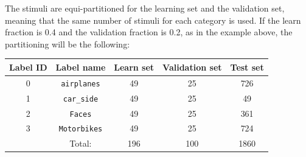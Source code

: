 \documentclass[a4paper,11pt,oneside]{article}
\begin{document}
The stimuli are equi-partitioned for the learning set and the validation set,
meaning that the same number of stimuli for each category is used.
If the learn fraction is 0.4 and the validation fraction is 0.2, as in the
example above, the partitioning will be the following:


\begin{center}
 \begin{tabular}{c c c c c}
 \hline
 Label ID & Label name & Learn set & Validation set & Test set \\ [0.5ex]
 \hline\hline
 0 & \lstinline!airplanes! & 49 & 25 & 726 \\
 \hline
 1 & \lstinline!car_side! & 49 & 25 & 49 \\
 \hline
 2 & \lstinline!Faces! & 49 & 25 & 361 \\
 \hline
 3 & \lstinline!Motorbikes! & 49 & 25 & 724 \\
 \hline\hline
  & Total: & 196 & 100 & 1860 \\
 \hline
\end{tabular}
\end{center}
\end{document}
